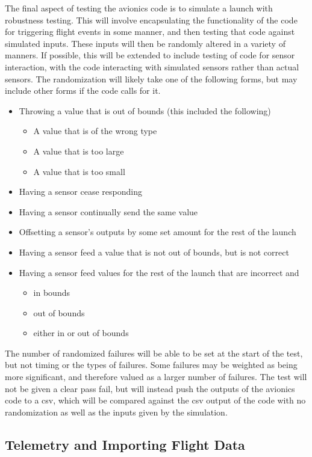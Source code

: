 \documentclass[onecolumn, draftclsnofoot, 10pt, compsoc]{IEEEtran}
\begin{document}
The final aspect of testing the avionics code is to simulate a launch with robustness testing. This will involve encapsulating the functionality of the code for triggering flight events in some manner, and then testing that code against simulated inputs. These inputs will then be randomly altered in a variety of manners. If possible, this will be extended to include testing of code for sensor interaction, with the code interacting with simulated sensors rather than actual sensors. The randomization will likely take one of the following forms, but may include other forms if the code calls for it. 
\begin{itemize}
\item Throwing a value that is out of bounds (this included the following)
\begin{itemize}
\item A value that is of the wrong type
\item A value that is too large
\item A value that is too small
\end{itemize}
\item Having a sensor cease responding
\item Having a sensor continually send the same value
\item Offsetting a sensor’s outputs by some set amount for the rest of the launch
\item Having a sensor feed a value that is not out of bounds, but is not correct
\item Having a sensor feed values for the rest of the launch that are incorrect and
\begin{itemize}
\item in bounds 
\item out of bounds
\item either in or out of bounds
\end{itemize}
\end{itemize}
The number of randomized failures will be able to be set at the start of the test, but not timing or the types of failures. Some failures may be weighted as being more significant, and therefore valued as a larger number of failures. The test will not be given a clear pass fail, but will instead push the outputs of the avionics code to a csv, which will be compared against the csv output of the code with no randomization as well as the inputs given by the simulation.

\subsection{Telemetry and Importing Flight Data}
\end{document}
